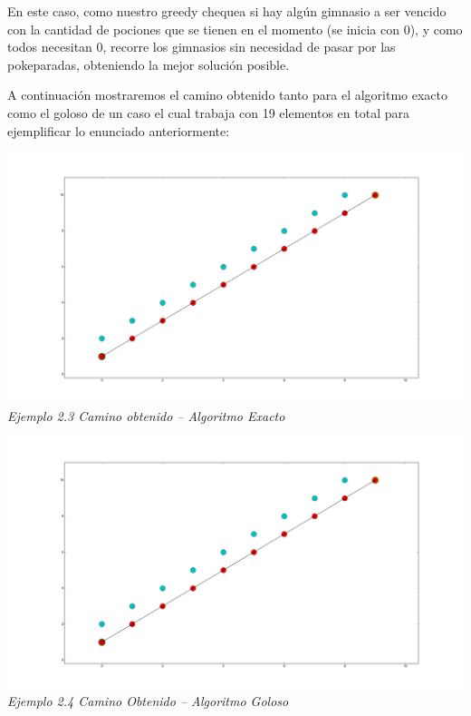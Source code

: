 En este caso, como nuestro greedy chequea si hay alg\'un gimnasio a ser vencido con la cantidad de pociones que se tienen en el momento (se inicia con 0), y como todos necesitan 0, recorre los gimnasios sin necesidad de pasar por las pokeparadas, obteniendo la mejor soluci\'on posible.

A continuaci\'on mostraremos el camino obtenido tanto para el algoritmo exacto como el goloso de un caso el cual trabaja con 19 elementos en total para ejemplificar lo enunciado anteriormente:

  \vspace*{0.3cm} \vspace*{0.3cm}
  \begin{center}
\includegraphics[scale=0.40]{./EJ2/grafotodos0.png}
\\{\textit{Ejemplo 2.3 Camino obtenido -- Algoritmo Exacto}}
  \end{center}
  \vspace*{0.3cm}

  \vspace*{0.3cm} \vspace*{0.3cm}
  \begin{center}
\includegraphics[scale=0.40]{./EJ2/grafotodos0.png}
\\{\textit{Ejemplo 2.4 Camino Obtenido -- Algoritmo Goloso}}
  \end{center}
  \vspace*{0.3cm}

